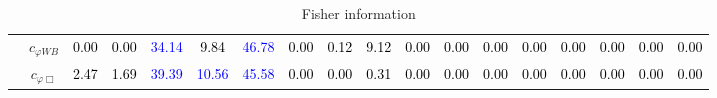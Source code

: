 \documentclass{article}
\begin{document}
\begin{landscape}
\begin{table}[H]
\begin{tabular}{|c|c|c|c|c|c|c|c|c|c|c|c|c|c|c|c|c|c|}
 & $c_{\varphi WB}$ & \textcolor{black}{0.00} & \textcolor{black}{0.00} & \textcolor{blue}{34.14} & \textcolor{black}{9.84} & \textcolor{blue}{46.78} & \textcolor{black}{0.00} & \textcolor{black}{0.12} & \textcolor{black}{9.12} & \textcolor{black}{0.00} & \textcolor{black}{0.00} & \textcolor{black}{0.00} & \textcolor{black}{0.00} & \textcolor{black}{0.00} & \textcolor{black}{0.00} & \textcolor{black}{0.00} & \textcolor{black}{0.00}\\ \cline{2-18}
 & $c_{\varphi \Box}$ & \textcolor{black}{2.47} & \textcolor{black}{1.69} & \textcolor{blue}{39.39} & \textcolor{blue}{10.56} & \textcolor{blue}{45.58} & \textcolor{black}{0.00} & \textcolor{black}{0.00} & \textcolor{black}{0.31} & \textcolor{black}{0.00} & \textcolor{black}{0.00} & \textcolor{black}{0.00} & \textcolor{black}{0.00} & \textcolor{black}{0.00} & \textcolor{black}{0.00} & \textcolor{black}{0.00} & \textcolor{black}{0.00}\\ \hline
\end{tabular}
\caption{Fisher information}
\end{table}
\end{landscape}
\end{document}
